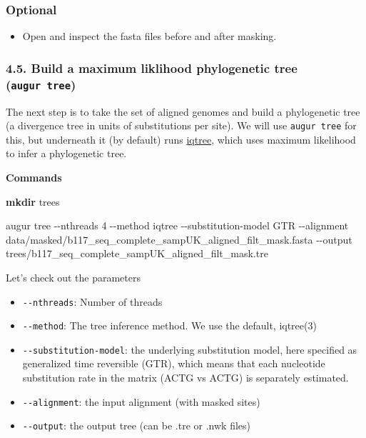 \documentclass[
]{book}
\newenvironment{Shaded}{\begin{snugshade}}{\end{snugshade}}
\newcommand{\AttributeTok}[1]{\textcolor[rgb]{0.13,0.29,0.53}{#1}}
\newcommand{\ExtensionTok}[1]{#1}
\newcommand{\FunctionTok}[1]{\textcolor[rgb]{0.13,0.29,0.53}{\textbf{#1}}}
\newcommand{\NormalTok}[1]{#1}
\providecommand{\tightlist}{%
  \setlength{\itemsep}{0pt}\setlength{\parskip}{0pt}}
\begin{document}
\subsubsection{Optional}\label{optional}

\begin{itemize}
\tightlist
\item
  Open and inspect the fasta files before and after masking.
\end{itemize}

\subsubsection{\texorpdfstring{4.5. Build a maximum liklihood phylogenetic tree (\texttt{augur\ tree})}{4.5. Build a maximum liklihood phylogenetic tree (augur tree)}}\label{build-a-maximum-liklihood-phylogenetic-tree-augur-tree}

The next step is to take the set of aligned genomes and build a phylogenetic tree (a divergence tree in units of substitutions per site). We will use \texttt{augur\ tree} for this, but underneath it (by default) runs \href{http://www.iqtree.org/}{iqtree}, which uses maximum likelihood to infer a phylogenetic tree.

\textbf{Commands}

\begin{Shaded}
\begin{Highlighting}[]
\FunctionTok{mkdir}\NormalTok{ trees}

\ExtensionTok{augur}\NormalTok{ tree }\AttributeTok{{-}{-}nthreads}\NormalTok{ 4 }\AttributeTok{{-}{-}method}\NormalTok{ iqtree }\AttributeTok{{-}{-}substitution{-}model}\NormalTok{ GTR }\AttributeTok{{-}{-}alignment}\NormalTok{ data/masked/b117\_seq\_complete\_sampUK\_aligned\_filt\_mask.fasta }\AttributeTok{{-}{-}output}\NormalTok{ trees/b117\_seq\_complete\_sampUK\_aligned\_filt\_mask.tre}
\end{Highlighting}
\end{Shaded}

Let's check out the parameters

\begin{itemize}
\tightlist
\item
  \texttt{-\/-nthreads}: Number of threads
\item
  \texttt{-\/-method}: The tree inference method. We use the default, iqtree(3)
\item
  \texttt{-\/-substitution-model}: the underlying substitution model, here specified as generalized time reversible (GTR), which means that each nucleotide substitution rate in the matrix (ACTG vs ACTG) is separately estimated.
\item
  \texttt{-\/-alignment}: the input alignment (with masked sites)
\item
  \texttt{-\/-output}: the output tree (can be .tre or .nwk files)
\end{itemize}
\end{document}
